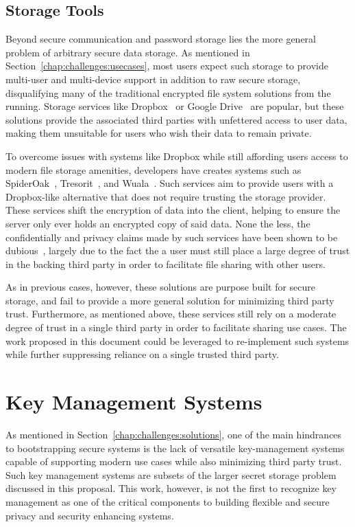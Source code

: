 \subsection{Storage Tools}

Beyond secure communication and password storage lies the more general
problem of arbitrary secure data storage. As mentioned in
Section~\ref{chap:challenges:usecases}, most users expect such storage
to provide multi-user and multi-device support in addition to raw
secure storage, disqualifying many of the traditional encrypted file
system solutions from the running. Storage services like
Dropbox~\cite{dropbox} or Google Drive~\cite{google-drive} are
popular, but these solutions provide the associated third parties with
unfettered access to user data, making them unsuitable for users who
wish their data to remain private.

To overcome issues with systems like Dropbox while still affording
users access to modern file storage amenities, developers have creates
systems such as SpiderOak~\cite{spideroak}, Tresorit~\cite{tresorit},
and Wuala~\cite{wuala}. Such services aim to provide users with a
Dropbox-like alternative that does not require trusting the storage
provider. These services shift the encryption of data into the client,
helping to ensure the server only ever holds an encrypted copy of said
data. None the less, the confidentially and privacy claims made by
such services have been shown to be dubious~\cite{wilson2014}, largely
due to the fact the a user must still place a large degree of trust in
the backing third party in order to facilitate file sharing with other
users.

As in previous cases, however, these solutions are purpose built for
secure storage, and fail to provide a more general solution for
minimizing third party trust. Furthermore, as mentioned above, these
services still rely on a moderate degree of trust in a single third
party in order to facilitate sharing use cases. The work proposed in
this document could be leveraged to re-implement such systems while
further suppressing reliance on a single trusted third party.

\section{Key Management Systems}
\label{chap:related:keymgmt}

As mentioned in Section~\ref{chap:challenges:solutions}, one of the
main hindrances to bootstrapping secure systems is the lack of
versatile key-management systems capable of supporting modern use
cases while also minimizing third party trust. Such key management
systems are subsets of the larger secret storage problem discussed in
this proposal. This work, however, is not the first to recognize key
management as one of the critical components to building flexible and
secure privacy and security enhancing systems.

